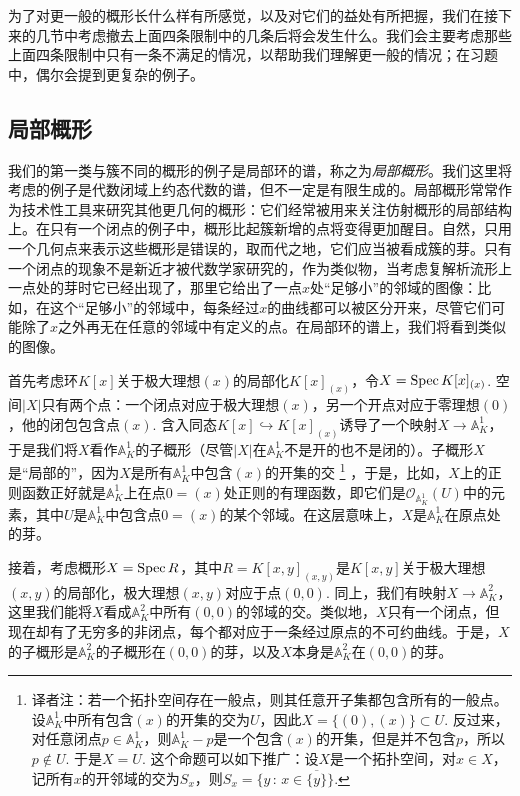 为了对更一般的概形长什么样有所感觉，以及对它们的益处有所把握，我们在接下来的几节中考虑撤去上面四条限制中的几条后将会发生什么。我们会主要考虑那些上面四条限制中只有一条不满足的情况，以帮助我们理解更一般的情况；在习题中，偶尔会提到更复杂的例子。

\subsection{局部概形}

我们的第一类与簇不同的概形的例子是局部环的谱，称之为\textit{局部概形}。我们这里将考虑的例子是代数闭域上约态代数的谱，但不一定是有限生成的。局部概形常常作为技术性工具来研究其他更几何的概形：它们经常被用来关注仿射概形的局部结构上。在只有一个闭点的例子中，概形比起簇新增的点将变得更加醒目。自然，只用一个几何点来表示这些概形是错误的，取而代之地，它们应当被看成簇的芽。只有一个闭点的现象不是新近才被代数学家研究的，作为类似物，当考虑复解析流形上一点处的芽时它已经出现了，那里它给出了一点$x$处“足够小”的邻域的图像：比如，在这个“足够小”的邻域中，每条经过$x$的曲线都可以被区分开来，尽管它们可能除了$x$之外再无在任意的邻域中有定义的点。在局部环的谱上，我们将看到类似的图像。

首先考虑环$K[x]$关于极大理想$(x)$的局部化$K[x]_{(x)}$，令$X=\operatorname{Spec} K[x]_{(x)}$. 空间$|X|$只有两个点：一个闭点对应于极大理想$(x)$，另一个开点对应于零理想$(0)$，他的闭包包含点$(x)$. 含入同态$K[x]\hookrightarrow K[x]_{(x)}$诱导了一个映射$X\to \mathbb{A}_K^1$，于是我们将$X$看作$\mathbb{A}_K^1$的子概形（尽管$|X|$在$\mathbb{A}_K^1$不是开的也不是闭的）。子概形$X$是“局部的”，因为$X$是所有$\mathbb{A}_K^1$中包含$(x)$的开集的交%
\footnote{译者注：若一个拓扑空间存在一般点，则其任意开子集都包含所有的一般点。设$\mathbb{A}_K^1$中所有包含$(x)$的开集的交为$U$，因此$X=\{(0),(x)\}\subset U$. 反过来，对任意闭点$p\in \mathbb{A}_K^1$，则$\mathbb{A}_K^1-p$是一个包含$(x)$的开集，但是并不包含$p$，所以$p\not\in U$. 于是$X=U$. 这个命题可以如下推广：设$X$是一个拓扑空间，对$x\in X$，记所有$x$的开邻域的交为$S_x$，则$S_x=\{y\,:\, x\in \overline{\{y\}}\}$.}%
，于是，比如，$X$上的正则函数正好就是$\mathbb{A}_K^1$上在点$0=(x)$处正则的有理函数，即它们是$\mathscr{O}_{\mathbb{A}_K^1}(U)$中的元素，其中$U$是$\mathbb{A}_K^1$中包含点$0=(x)$的某个邻域。在这层意味上，$X$是$\mathbb{A}_K^1$在原点处的芽。

接着，考虑概形$X=\operatorname{Spec} R$，其中$R=K[x,y]_{(x,y)}$是$K[x,y]$关于极大理想$(x,y)$的局部化，极大理想$(x,y)$对应于点$(0,0)$. 同上，我们有映射$X\to \mathbb{A}_K^2$，这里我们能将$X$看成$\mathbb{A}_K^2$中所有$(0,0)$的邻域的交。类似地，$X$只有一个闭点，但现在却有了无穷多的非闭点，每个都对应于一条经过原点的不可约曲线。于是，$X$的子概形是$\mathbb{A}_K^2$的子概形在$(0,0)$的芽，以及$X$本身是$\mathbb{A}_K^2$在$(0,0)$的芽。


